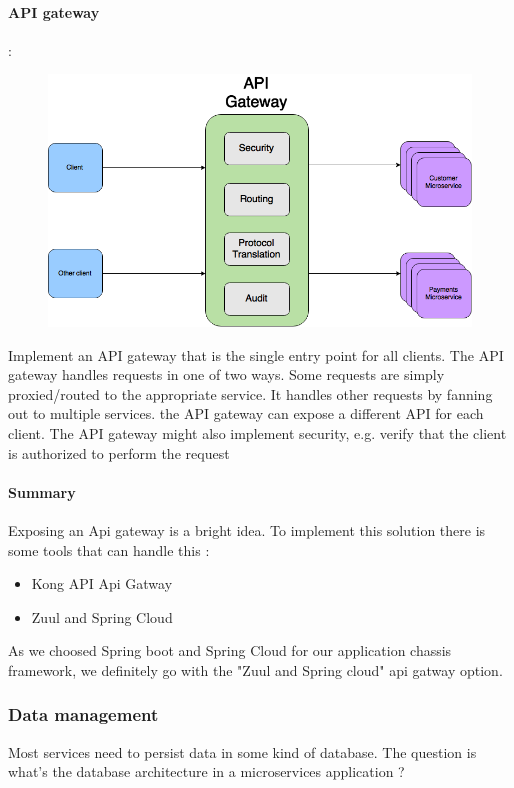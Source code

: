 \paragraph{API gateway} :\\
\label{sec:sec01}
\begin{figure}[h!]
	\centering
	\includegraphics[height=0.3\textheight]{fig01/apiGatway}
	\label{fig:FilialesEtClients}
\end{figure}
Implement an API gateway that is the single entry point for all clients.
 The API gateway handles requests in one of two ways. 
 Some requests are simply proxied/routed to the appropriate service. 
 It handles other requests by fanning out to multiple services.
the API gateway can expose a different API for each client.
The API gateway might also implement security, e.g. verify that the client is authorized to perform the request
\paragraph{Summary}
\label{sec:sec01}
Exposing an Api gateway is a bright idea. To implement this solution there is some tools that can handle this :
\begin{itemize}
  \item Kong API Api Gatway
  \item Zuul and Spring Cloud
 \end{itemize}
As we choosed Spring boot and Spring Cloud for our application chassis framework,
 we definitely go with the "Zuul and Spring cloud" api gatway option.
\subsubsection{Data management}
\label{sec:sec01}
Most services need to persist data in some kind of database. The question is 
what's the database architecture in a microservices application ?
